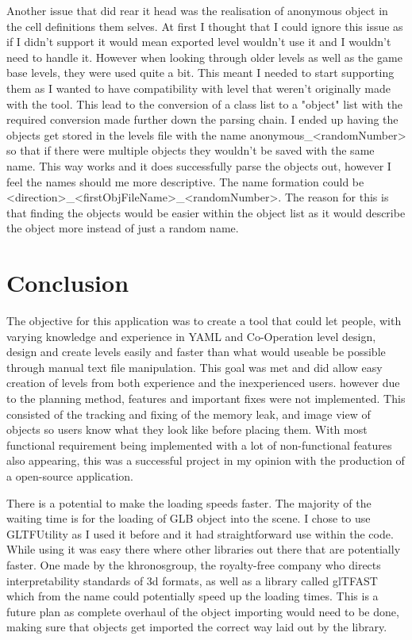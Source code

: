 Another issue that did rear it head was the realisation of anonymous object in the cell definitions them selves. At first I thought that I could ignore this issue as if I didn't support it would mean exported level wouldn't use it and I wouldn't need to handle it. However when looking through older levels as well as the game base levels, they were used quite a bit. This meant I needed to start supporting them as I wanted to have compatibility with level that weren't originally made with the tool. This lead to the conversion of a class list to a "object" list with the required conversion made further down the parsing chain. I ended up having the objects get stored in the levels file with the name anonymous\_<randomNumber> so that if there were multiple objects they wouldn't be saved with the same name. This way works and it does successfully parse the objects out, however I feel the names should me more descriptive. The name formation could be <direction>\_<firstObjFileName>\_<randomNumber>. The reason for this is that finding the objects would be easier within the object list as it would describe the object more instead of just a random name.


\section{Conclusion}
The objective for this application was to create a tool that could let people, with varying knowledge and experience in YAML and Co-Operation level design, design and create levels easily and faster than what would useable be possible through manual text file manipulation. This goal was met and did allow easy creation of levels from both experience and the inexperienced users. however due to the planning  method, features and important fixes were not implemented. This consisted of the tracking and fixing of the memory leak, and image view of objects so users know what they look like before placing them. With most functional requirement being implemented with a lot of non-functional features also appearing, this was a successful project in my opinion with the production of a open-source application. 

There is a potential to make the loading speeds faster. The majority of the waiting time is for the loading of GLB object into the scene. I chose to use GLTFUtility as I used it before and it had straightforward use within the code. While using it was easy there where other libraries out there that are potentially faster. One made by the khronosgroup, the royalty-free company who directs interpretability standards of 3d formats, as well as a library called glTFAST which from the name could potentially speed up the loading times. This is a future plan as complete overhaul of the object importing would need to be done, making sure that objects get imported the correct way laid out by the library.

